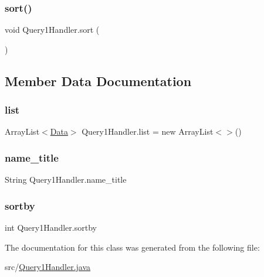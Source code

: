 \subsubsection{\texorpdfstring{sort()}{sort()}}
{\footnotesize\ttfamily void Query1\+Handler.\+sort (\begin{DoxyParamCaption}{ }\end{DoxyParamCaption})}



\subsection{Member Data Documentation}
\hypertarget{class_query1_handler_a33fc67d9100cbc74abaaa35ba6f1d90c}{}\label{class_query1_handler_a33fc67d9100cbc74abaaa35ba6f1d90c} 
\subsubsection{\texorpdfstring{list}{list}}
{\footnotesize\ttfamily Array\+List$<$\hyperlink{class_data}{Data}$>$ Query1\+Handler.\+list = new Array\+List$<$$>$()\hspace{0.3cm}{\ttfamily [private]}}

\hypertarget{class_query1_handler_a28ae63ec11d4898c14edb5a236b2eaf0}{}\label{class_query1_handler_a28ae63ec11d4898c14edb5a236b2eaf0} 
\subsubsection{\texorpdfstring{name\+\_\+title}{name\_title}}
{\footnotesize\ttfamily String Query1\+Handler.\+name\+\_\+title\hspace{0.3cm}{\ttfamily [private]}}

\hypertarget{class_query1_handler_a3ff52874fd305e4df617cb7b2b66fcc7}{}\label{class_query1_handler_a3ff52874fd305e4df617cb7b2b66fcc7} 
\subsubsection{\texorpdfstring{sortby}{sortby}}
{\footnotesize\ttfamily int Query1\+Handler.\+sortby\hspace{0.3cm}{\ttfamily [private]}}



The documentation for this class was generated from the following file\+:\begin{DoxyCompactItemize}
\item 
src/\hyperlink{_query1_handler_8java}{Query1\+Handler.\+java}\end{DoxyCompactItemize}
